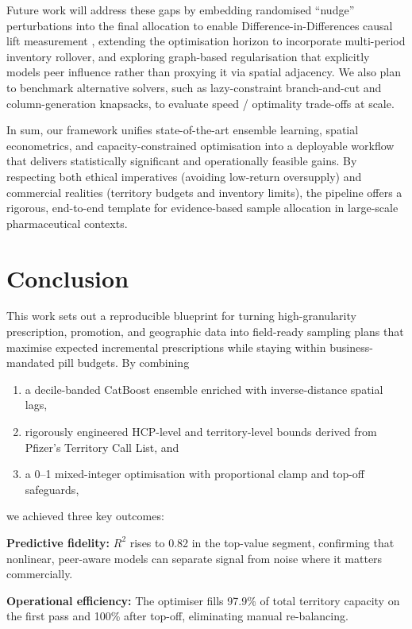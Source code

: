 Future work will address these gaps by embedding randomised ``nudge'' perturbations into the final allocation to enable Difference-in-Differences causal lift measurement \citep{Hallettetal2024}, extending the optimisation horizon to incorporate multi-period inventory rollover, and exploring graph-based regularisation that explicitly models peer influence rather than proxying it via spatial adjacency. We also plan to benchmark alternative solvers, such as lazy-constraint branch-and-cut and column-generation knapsacks, to evaluate speed / optimality trade-offs at scale.

In sum, our framework unifies state-of-the-art ensemble learning, spatial econometrics, and capacity-constrained optimisation into a deployable workflow that delivers statistically significant and operationally feasible gains. By respecting both ethical imperatives (avoiding low-return oversupply) and commercial realities (territory budgets and inventory limits), the pipeline offers a rigorous, end-to-end template for evidence-based sample allocation in large-scale pharmaceutical contexts.

\section{Conclusion}
This work sets out a reproducible blueprint for turning high-granularity prescription, promotion, and geographic data into field-ready sampling plans that maximise expected incremental prescriptions while staying within business-mandated pill budgets. By combining
\begin{enumerate}
  \item a decile-banded CatBoost ensemble enriched with inverse-distance spatial lags,
  \item rigorously engineered HCP-level and territory-level bounds derived from Pfizer's Territory Call List, and
  \item a 0--1 mixed-integer optimisation with proportional clamp and top-off safeguards,
\end{enumerate}
we achieved three key outcomes:

\textbf{Predictive fidelity:} \(R^2\) rises to 0.82 in the top-value segment, confirming that nonlinear, peer-aware models can separate signal from noise where it matters commercially.

\textbf{Operational efficiency:} The optimiser fills 97.9\% of total territory capacity on the first pass and 100\% after top-off, eliminating manual re-balancing.

